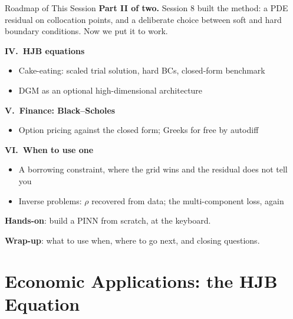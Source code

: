 \documentclass[aspectratio=169,11pt]{beamer}
\begin{document}
\begin{frame}{Roadmap of This Session}
\textbf{Part II of two.}  Session 8 built the method: a PDE residual on collocation points, and a
deliberate choice between soft and hard boundary conditions.  Now we put it to work.

\vspace{0.6em}
\textbf{IV.\ HJB equations}
\begin{itemize}\setlength\itemsep{1pt}
    \item Cake-eating: scaled trial solution, hard BCs, closed-form benchmark
    \item DGM as an optional high-dimensional architecture
\end{itemize}

\vspace{0.5em}
\textbf{V.\ Finance: Black--Scholes}
\begin{itemize}\setlength\itemsep{1pt}
    \item Option pricing against the closed form; Greeks for free by autodiff
\end{itemize}

\vspace{0.5em}
\textbf{VI.\ When to use one}
\begin{itemize}\setlength\itemsep{1pt}
    \item A borrowing constraint, where the grid wins and the residual does not tell you
    \item Inverse problems: $\rho$ recovered from data; the multi-component loss, again
\end{itemize}

\vspace{0.5em}
\textbf{Hands-on}: build a PINN from scratch, at the keyboard.

\vspace{0.3em}
\textbf{Wrap-up}: what to use when, where to go next, and closing questions.
\end{frame}


\section{Economic Applications: the HJB Equation}
\end{document}
